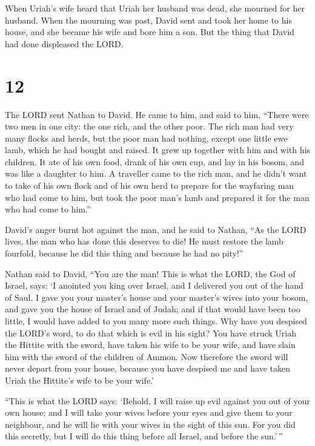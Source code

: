  When Uriah's wife heard that Uriah her husband was dead,
she mourned for her husband.  When the mourning was past,
David sent and took her home to his house, and she became his wife and
bore him a son. But the thing that David had done displeased the LORD.

\hypertarget{section-11}{%
\section{12}\label{section-11}}

 The LORD sent Nathan to David. He came to him, and said
to him, ``There were two men in one city: the one rich, and the other
poor.  The rich man had very many flocks and herds,
 but the poor man had nothing, except one little ewe lamb,
which he had bought and raised. It grew up together with him and with
his children. It ate of his own food, drank of his own cup, and lay in
his bosom, and was like a daughter to him.  A traveller
came to the rich man, and he didn't want to take of his own flock and of
his own herd to prepare for the wayfaring man who had come to him, but
took the poor man's lamb and prepared it for the man who had come to
him.''

 David's anger burnt hot against the man, and he said to
Nathan, ``As the LORD lives, the man who has done this deserves to die!
 He must restore the lamb fourfold, because he did this
thing and because he had no pity!''

 Nathan said to David, ``You are the man! This is what the
LORD, the God of Israel, says: `I anointed you king over Israel, and I
delivered you out of the hand of Saul.  I gave you your
master's house and your master's wives into your bosom, and gave you the
house of Israel and of Judah; and if that would have been too little, I
would have added to you many more such things.  Why have
you despised the LORD's word, to do that which is evil in his sight? You
have struck Uriah the Hittite with the sword, have taken his wife to be
your wife, and have slain him with the sword of the children of Ammon.
 Now therefore the sword will never depart from your
house, because you have despised me and have taken Uriah the Hittite's
wife to be your wife.'

 ``This is what the LORD says: `Behold, I will raise up
evil against you out of your own house; and I will take your wives
before your eyes and give them to your neighbour, and he will lie with
your wives in the sight of this sun.  For you did this
secretly, but I will do this thing before all Israel, and before the
sun.'\,''

